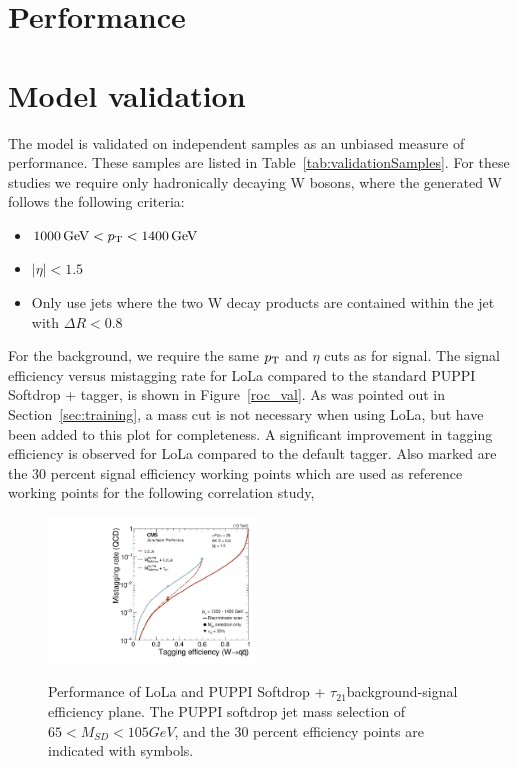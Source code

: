 \section{Performance}
\section{Model validation}
\label{sec:validation}

The model is validated on independent samples as an unbiased measure of performance. These samples are listed in Table~\ref{tab:validationSamples}.
For these studies we require only hadronically decaying W bosons, where the generated W follows the following criteria:
\begin{itemize}
\item $ 1000 \,\text{Ge\hspace{-.08em}V} < p_{\mathrm{T}} < 1400 \,\text{Ge\hspace{-.08em}V}$
\item $|\eta| < 1.5$
\item Only use jets where the two W decay products are contained within the jet with $\Delta R < 0.8$
\end{itemize}
For the background, we require the same $p_{\mathrm{T}}$ and $\eta$ cuts as for signal. The signal efficiency versus mistagging rate for LoLa compared to
the standard PUPPI Softdrop + \nsubj tagger, is shown in Figure~\ref{roc_val}. As was pointed out in Section~\ref{sec:training}, a mass cut is not necessary when using LoLa, but have been added to this plot for completeness. A significant improvement in tagging efficiency is observed for LoLa compared to the default tagger. Also marked are the 30 percent signal efficiency working points which are used as reference working points for the following correlation study,


\begin{figure}[htb]
\centering
\includegraphics[width=0.49\textwidth]{figures/vtagging/AN-18-099/validation/roc_ZpWqqvsQCD.pdf}\\

\caption{Performance of LoLa and  PUPPI Softdrop + $\tau_{21}$background-signal efficiency plane. The PUPPI softdrop jet mass
selection of $65 < M_{SD} < 105 GeV$, and the 30 percent efficiency points are indicated with symbols.}
\label{fig:roc_val}
\end{figure}


